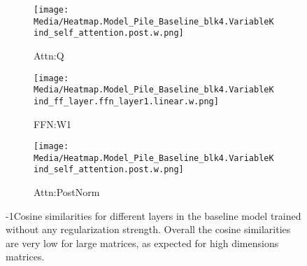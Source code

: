 \begin{figure*}[tbp]%
\centering
    \hspace{-0.1in}
    \begin{subfigure}{0.33\textwidth}
    \centering    \texttt{[image: Media/Heatmap.Model\_Pile\_Baseline\_blk4.VariableKind\_self\_attention.post.w.png]}
    \caption{Attn:Q}
    \label{fig:cosines_baseline_attn_q}
    \end{subfigure}\hfill
\centering
    \begin{subfigure}{0.33\textwidth}
    \centering    \texttt{[image: Media/Heatmap.Model\_Pile\_Baseline\_blk4.VariableKind\_ff\_layer.ffn\_layer1.linear.w.png]}
    \caption{FFN:W1}
    \label{fig:cosines_baseline_ffn_w1}
    \end{subfigure}\hfill
\centering
    \begin{subfigure}{0.33\textwidth}
    \centering   
     \texttt{[image: Media/Heatmap.Model\_Pile\_Baseline\_blk4.VariableKind\_self\_attention.post.w.png]}
    \caption{Attn:PostNorm}
    \label{fig:cosines_baseline_postnorm}
    \end{subfigure}\hfill
    \caption{\looseness-1Cosine similarities for different layers in the baseline model trained without any regularization strength. Overall the cosine similarities are very low for large matrices, as expected for high dimensions matrices.}
    \label{fig:cosine_similarity}
\end{figure*}


